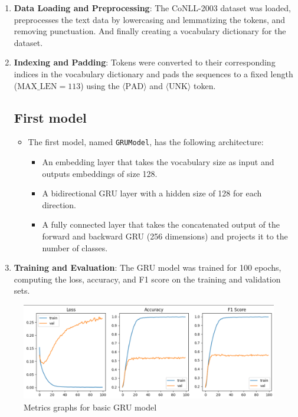 \documentclass[12pt, a4paper]{article}
\begin{document}
\begin{enumerate}
    \item \textbf{Data Loading and Preprocessing}: The CoNLL-2003 dataset was loaded, preprocesses the text data by lowercasing and lemmatizing the tokens, and removing punctuation. And finally creating a vocabulary dictionary for the dataset.
    \item \textbf{Indexing and Padding}: Tokens were converted to their corresponding indices in the vocabulary dictionary and pads the sequences to a fixed length ($\text{MAX\_LEN}=113$) using the $\langle\text{PAD}\rangle$ and $\langle\text{UNK}\rangle$ token.

\subsection{First model}
    
    \begin{itemize}
        \item The first model, named \texttt{GRUModel}, has the following architecture:
        \begin{itemize}
            \item An embedding layer that takes the vocabulary size as input and outputs embeddings of size 128.
            \item A bidirectional GRU layer with a hidden size of 128 for each direction.
            \item A fully connected layer that takes the concatenated output of the forward and backward GRU (256 dimensions) and projects it to the number of classes.
        \end{itemize}
    \end{itemize}
    
    \item \textbf{Training and Evaluation}: The GRU model was trained for 100 epochs, computing the loss, accuracy, and F1 score on the training and validation sets. 
\end{enumerate}

\begin{figure}[H]
    \centering
    \includegraphics[width=0.5\linewidth]{graphs.png}
    \caption{Metrics graphs for basic GRU model}
    \label{fig:enter-label}
\end{figure}
\end{document}
